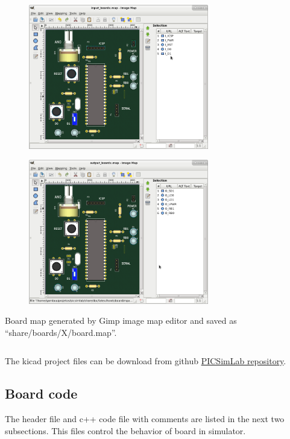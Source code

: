 \begin{figure}[H]
\center
\includegraphics[width=0.7\textwidth]{img/hb/gimp06.png} 
\end{figure} 

\begin{figure}[H]
\center
\includegraphics[width=0.7\textwidth]{img/hb/gimp07.png} 
\end{figure} 

Board map generated by Gimp image map editor and saved as ``share/boards/X/board.map''.
\inputminted[baselinestretch=1.2,fontsize=\footnotesize,linenos]{html}{files/share/board.map}

The kicad project files can be download from github \href{https://github.com/lcgamboa/picsimlab/tree/master/docs/kicad/board_x}{PICSimLab repository}. 

\subsection{Board code}

The header file and c++ code file with comments are listed in the next two subsections. This files control the behavior of board in simulator.

